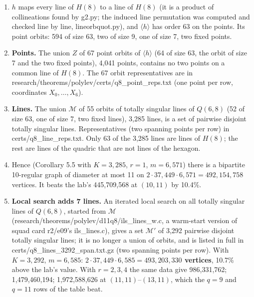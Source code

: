 \documentclass[
  10pt,
]{article}
\providecommand{\tightlist}{%
  \setlength{\itemsep}{0pt}\setlength{\parskip}{0pt}}
\begin{document}
\begin{enumerate}
\def\labelenumi{\arabic{enumi}.}
\tightlist
\item
  \(h\) maps every line of \(H(8)\) to a line of \(H(8)\) (it is a
  product of collineations found by g2.py; the induced line permutation
  was computed and checked line by line, lineorbquot.py), and
  \(\langle h\rangle\) has order 63 on the points. Its point orbits: 594
  of size 63, two of size 9, one of size 7, two fixed points.
\item
  \textbf{Points.} The union \(Z\) of 67 point orbits of
  \(\langle h\rangle\) (64 of size 63, the orbit of size 7 and the two
  fixed points), 4,041 points, contains no two points on a common line
  of \(H(8)\). The 67 orbit representatives are in
  research/theorems/polylev/certs/q8\_point\_reps.txt (one point per
  row, coordinates \(X_0,\dots,X_6\)).
\item
  \textbf{Lines.} The union \(\mathcal M\) of 55 orbits of totally
  singular lines of \(Q(6,8)\) (52 of size 63, one of size 7, two fixed
  lines), 3,285 lines, is a set of pairwise disjoint totally singular
  lines. Representatives (two spanning points per row) in
  certs/q8\_line\_reps.txt. Only 63 of the 3,285 lines are lines of
  \(H(8)\); the rest are lines of the quadric that are not lines of the
  hexagon.
\item
  Hence (Corollary 5.5 with \(K = 3{,}285\), \(r = 1\), \(m = 6{,}571\))
  there is a bipartite 10-regular graph of diameter at most 11 on
  \(2\cdot 37{,}449\cdot 6{,}571 = 492{,}154{,}758\) vertices. It beats
  the lab's 445,709,568 at \((10,11)\) by 10.4\%.
\item
  \textbf{Local search adds 7 lines.} An iterated local search on all
  totally singular lines of \(Q(6,8)\), started from \(\mathcal M\)
  (research/theorems/polylev/d11q8/ils\_lines\_w.c, a warm-start version
  of squad card r2/e09's ils\_lines.c), gives a set \(\mathcal M'\) of
  3,292 pairwise disjoint totally singular lines; it is no longer a
  union of orbits, and is listed in full in
  certs/q8\_lines\_3292\_span.txt.gz (two spanning points per row). With
  \(K = 3{,}292\), \(m = 6{,}585\):
  \textbf{\(2\cdot 37{,}449\cdot 6{,}585 = 493{,}203{,}330\) vertices},
  10.7\% above the lab's value. With \(r = 2,3,4\) the same data give
  986,331,762; 1,479,460,194; 1,972,588,626 at \((11,11)\)--\((13,11)\),
  which the \(q = 9\) and \(q = 11\) rows of the table beat.
\end{enumerate}
\end{document}
